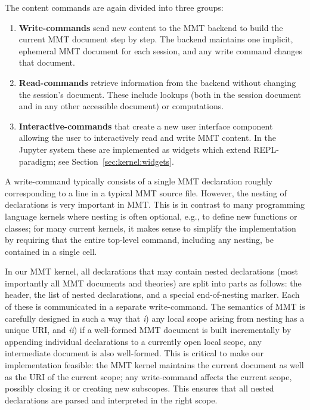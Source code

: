 The content commands are again divided into three groups:
\begin{enumerate}
 \item \textbf{Write-commands} send new content to the MMT backend to build the current MMT document step by step.
   The backend maintains one implicit, ephemeral MMT document for each session, and any write command changes that document.
 \item \textbf{Read-commands} retrieve information from the backend without changing the session's document.
   These include lookups (both in the session document and in any other accessible document) or computations.
  \item \textbf{Interactive-commands} that create a new user interface component allowing the user to interactively read and write MMT content. 
   In the Jupyter system these are implemented as widgets which extend REPL-paradigm; see Section~\ref{sec:kernel:widgets}. 
\end{enumerate}

A write-command typically consists of a single MMT declaration roughly corresponding to a line in a typical MMT source file.
However, the nesting of declarations is very important in MMT.
This is in contrast to many programming language kernels where nesting is often optional, e.g., to define new functions or classes;
for many current kernels, it makes sense to simplify the implementation by requiring that the entire top-level command, including any nesting, be contained in a single cell.

In our MMT kernel, all declarations that may contain nested declarations (most importantly all MMT documents and theories) are split into parts as follows: the header, the list of nested declarations, and a special end-of-nesting marker.
Each of these is communicated in a separate write-command.
The semantics of MMT is carefully designed in such a way that \emph{i}) any local scope arising from nesting has a unique URI, and \emph{ii}) if a well-formed MMT document is built incrementally by appending individual declarations to a currently open local scope, any intermediate document is also well-formed.
This is critical to make our implementation feasible: the MMT kernel maintains the current document as well as the URI of the current scope; any write-command affects the current scope, possibly closing it or creating new subscopes.
This ensures that all nested declarations are parsed and interpreted in the right scope.

